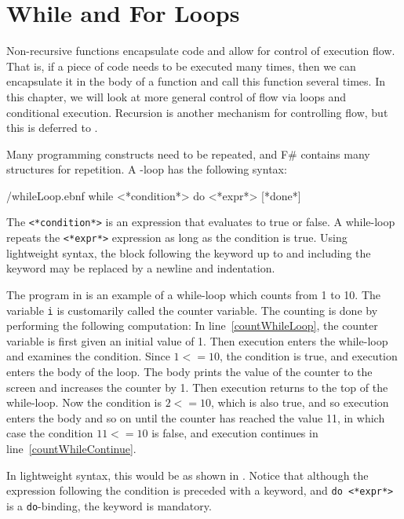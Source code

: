 \documentclass[springer.tex]{subfiles}
\begin{document}
\chapter{While and For Loops}
\label{chap:flow}
Non-recursive functions encapsulate code and allow for control of execution flow. That is, if a piece of code needs to be executed many times, then we can encapsulate it in the body of a function and call this function several times. In this chapter, we will look at more general control of flow via loops and conditional execution. Recursion is another mechanism for controlling flow, but this is deferred to .

Many programming constructs need to be repeated, and F\# contains many structures for repetition. A -loop has the following syntax:
%
\begin{verbatimwrite}{\ebnf/whileLoop.ebnf}
while <*condition*> do <*expr*> [*done*]
\end{verbatimwrite}
%
The  \lstinline[language=syntax]{<*condition*>} is an expression that evaluates to true or false. A while-loop repeats the \lstinline[language=syntax]{<*expr*>} expression as long as the condition is true.  Using lightweight syntax, the block following the  keyword up to and including the  keyword may be replaced by a newline and indentation.

The program in  is an example of a while-loop which counts from 1 to 10.
%
%
The variable \lstinline{i} is customarily called the counter variable. The counting is done by performing the following computation: In line~\ref{countWhileLoop}, the counter variable is first given an initial value of 1. Then execution enters the while-loop and examines the condition. Since $1 <= 10$, the condition is true, and execution enters the body of the loop. The body prints the value of the counter to the screen and increases the counter by 1. Then execution returns to the top of the while-loop. Now the condition is $2 <= 10$, which is also true, and so execution enters the body and so on until the counter has reached the value 11, in which case the condition $11 <= 10$ is false, and execution continues in line~\ref{countWhileContinue}.

In lightweight syntax, this would be as shown in .
%
%
Notice that although the expression following the condition is preceded with a  keyword, and \lstinline[language=syntax]{do <*expr*>} is a \lstinline{do}-binding, the keyword  is mandatory. 
\end{document}
